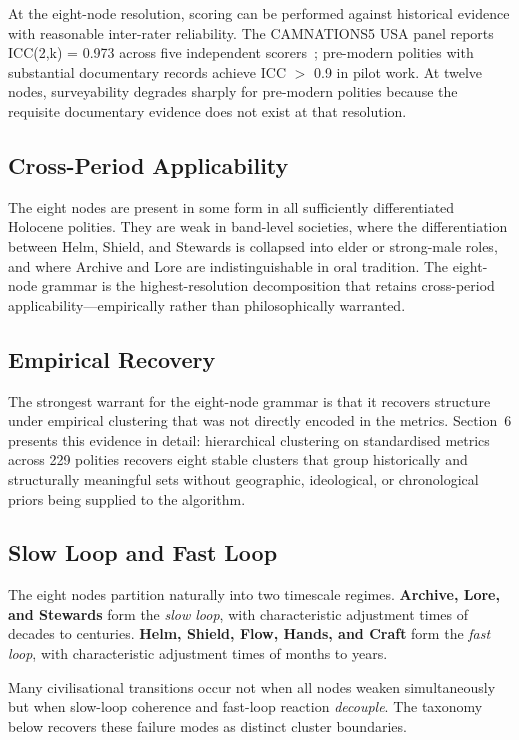 \documentclass[12pt,a4paper]{article}
\begin{document}
At the eight-node resolution, scoring can be performed against historical evidence with reasonable inter-rater reliability. The CAMNATIONS5 USA panel reports ICC(2,k) = 0.973 across five independent scorers~\cite{mckern2026usa}; pre-modern polities with substantial documentary records achieve ICC $>$ 0.9 in pilot work. At twelve nodes, surveyability degrades sharply for pre-modern polities because the requisite documentary evidence does not exist at that resolution.

\subsection{Cross-Period Applicability}

The eight nodes are present in some form in all sufficiently differentiated Holocene polities. They are weak in band-level societies, where the differentiation between Helm, Shield, and Stewards is collapsed into elder or strong-male roles, and where Archive and Lore are indistinguishable in oral tradition. The eight-node grammar is the highest-resolution decomposition that retains cross-period applicability---empirically rather than philosophically warranted.

\subsection{Empirical Recovery}

The strongest warrant for the eight-node grammar is that it recovers structure under empirical clustering that was not directly encoded in the metrics. Section~6 presents this evidence in detail: hierarchical clustering on standardised metrics across 229 polities recovers eight stable clusters that group historically and structurally meaningful sets without geographic, ideological, or chronological priors being supplied to the algorithm.

\subsection{Slow Loop and Fast Loop}

The eight nodes partition naturally into two timescale regimes. \textbf{Archive, Lore, and Stewards} form the \textit{slow loop}, with characteristic adjustment times of decades to centuries. \textbf{Helm, Shield, Flow, Hands, and Craft} form the \textit{fast loop}, with characteristic adjustment times of months to years.

Many civilisational transitions occur not when all nodes weaken simultaneously but when slow-loop coherence and fast-loop reaction \textit{decouple}. The taxonomy below recovers these failure modes as distinct cluster boundaries.
\end{document}
